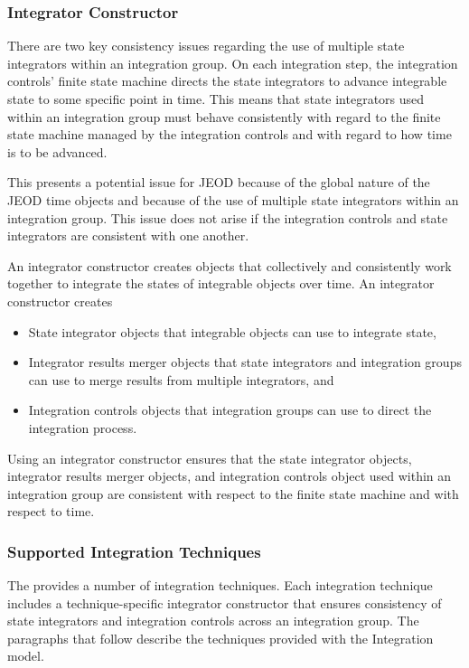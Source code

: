 \subsubsection{Integrator Constructor}
There are two key consistency issues regarding the use of multiple state
integrators within an integration group. On each integration step,
the integration controls' finite state machine directs the state integrators
to advance integrable state to some specific point in time. This means that
state integrators used within an integration group must behave consistently with
regard to the finite state machine managed by the integration controls and
with regard to how time is to be advanced.

This presents a potential issue for JEOD because of the global nature of the
JEOD time objects and because of the use of multiple state integrators within
an integration group. This issue does not arise if the integration controls and
state integrators are consistent with one another.

An integrator constructor creates objects that collectively and consistently
work together to integrate the states of integrable objects over time.
An integrator constructor creates\begin{itemize}
\item State integrator objects that integrable objects can use to
integrate state,
\item Integrator results merger objects that state integrators and integration
groups can use to merge results from multiple integrators, and
\item Integration controls objects that integration groups can use to
direct the integration process.
\end{itemize}
Using an integrator constructor ensures that the state integrator objects,
integrator results merger objects, and integration controls object used within
an integration group are consistent with respect to the finite state machine
and with respect to time.

\subsubsection{Supported Integration Techniques}
\label{sec:con_des_er7_integ_techniques}

The \erseven provides a number of integration techniques. Each integration
technique includes a technique-specific integrator constructor that ensures
consistency of state integrators and integration controls across an integration
group. The paragraphs that follow describe the techniques provided with
the \erseven Integration model.

